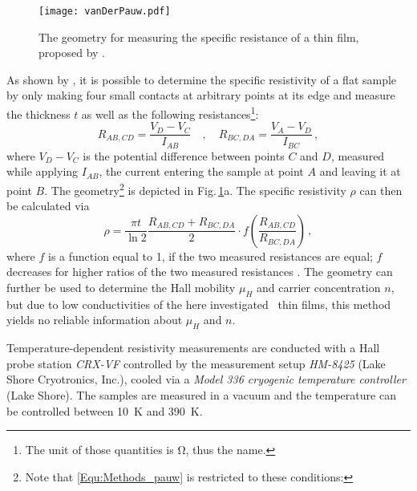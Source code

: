 \begin{figure}
    \centering
    \texttt{[image: vanDerPauw.pdf]}
    \caption{The geometry for measuring the specific resistance of a thin film, proposed by \textcite{pauw1958}.}
    \label{Fig:Methods_pauwGeometry}
\end{figure}

As shown by \textcite{pauw1958}, it is possible to determine the specific resistivity of a flat sample by only making four small contacts at arbitrary points at its edge and measure the thickness $t$ as well as the following resistances\footnote{
    The unit of those quantities is \unit{\ohm}, thus the name.
}:
\begin{equation}
    R_{AB,CD}=\frac{V_D-V_C}{I_{AB}}\quad , \quad
    R_{BC,DA}=\frac{V_A-V_D}{I_{BC}}\,,
\end{equation}
where $V_D-V_C$ is the potential difference between points $C$ and $D$, measured while applying $I_{AB}$, the current entering the sample at point $A$ and leaving it at point $B$.
The geometry\footnote{
    Note that \eqref{Equ:Methods_pauw} is restricted to these conditions:
} is depicted in Fig.\,\ref{Fig:Methods_pauwGeometry}a.
The specific resistivity $\rho$ can then be calculated via
\begin{equation}
    \label{Equ:Methods_pauw}
    \rho=
    \frac{\pi t}{\ln2}
    \frac{R_{AB,CD}+R_{BC,DA}}{2}
    \cdot f\left(\frac{R_{AB,CD}}{R_{BC,DA}}\right)\,,
\end{equation}
where $f$ is a function equal to 1, if the two measured resistances are equal; $f$ decreases for higher ratios of the two measured resistances
    \cite{pauw1958}.
The geometry can further be used to determine the Hall mobility $\mu_H$ and carrier concentration $n$, but due to low conductivities of the here investigated \cro\ thin films, this method yields no reliable information about $\mu_H$ and $n$.

Temperature-dependent resistivity measurements are conducted with a Hall probe station \textit{CRX-VF} controlled by the measurement setup \textit{HM-8425} (Lake Shore Cryotronics, Inc.), cooled via a \textit{Model 336 cryogenic temperature controller} (Lake Shore).
The samples are measured in a vacuum and the temperature can be controlled between \qty{10}{\kelvin} and \qty{390}{\kelvin}.